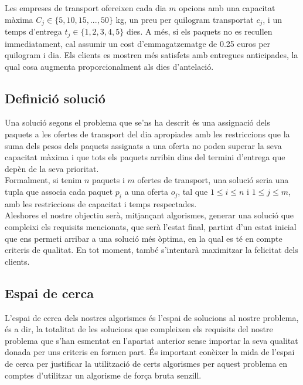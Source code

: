 \documentclass[a4paper]{article}
\begin{document}
	Les empreses de transport ofereixen cada dia $m$ opcions amb una capacitat màxima $C_j \in \{5, 10, 15, ..., 50\}$ kg, un preu per quilogram transportat $c_j$, i un temps d'entrega $t_j \in \{1, 2, 3, 4, 5\}$ dies. A més, si els paquets no es recullen immediatament, cal assumir un cost d'emmagatzematge de 0.25 euros per quilogram i dia. Els clients es mostren més satisfets amb entregues anticipades, la qual cosa augmenta proporcionalment als dies d'antelació. \\

	\subsection{Definició solució}

	Una solució segons el problema que se'ns ha descrit és una assignació dels paquets a les ofertes de transport del dia apropiades amb les restriccions que la suma dels pesos dels paquets assignats a una oferta no poden superar la seva capacitat màxima i que tots els paquets arribin dins del termini d'entrega que depèn de la seva prioritat. \\

	Formalment, si tenim $n$ paquets i $m$ ofertes de transport, una solució seria una tupla que associa cada paquet $p_i$ a una oferta $o_j$, tal que $1 \leq i \leq n$ i $1 \leq j \leq m$, amb les restriccions de capacitat i temps respectades. \\

	Aleshores el nostre objectiu serà, mitjançant algorismes, generar una solució que compleixi els requisits mencionats, que serà l'estat final, partint d'un estat inicial que ens permeti arribar a una solució més òptima, en la qual es té en compte criteris de qualitat. En tot moment, també s'intentarà maximitzar la felicitat dels clients. \\

	\subsection{Espai de cerca}

	L'espai de cerca dels nostres algorismes és l'espai de solucions al nostre problema, és a dir, la totalitat de les solucions que compleixen els requisits del nostre problema que s'han esmentat en l'apartat anterior sense importar la seva qualitat donada per uns criteris en formen part. És important conèixer la mida de l'espai de cerca per justificar la utilització de certs algorismes per aquest problema en comptes d'utilitzar un algorisme de força bruta senzill. \\
\end{document}
